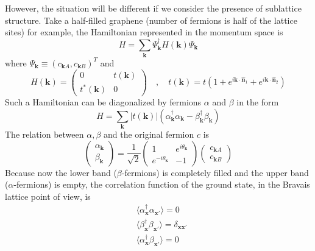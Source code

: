 \documentclass[12font]{article}
\theoremstyle{definition}
\numberwithin{equation}{section}
\newcommand{\anglelr}[1]{\langle #1 \rangle}
\newcommand{\llr}[1]{(  #1  )}
\newcommand{\abs}[1]{\left|  #1  \right|}
\newcommand{\bo}[1]{\mathbf{#1}}
\begin{document}
However, the situation will be different if we consider the presence of sublattice structure. Take a half-filled graphene (number of fermions is half of the lattice sites) for example, the Hamiltonian represented in the momentum space is
\[
H = \sum_{\bo{k}}\Psi_{\bo{k}}^\dagger H\llr{\bo{k}}\Psi_{\bo{k}}
\]
where $\Psi_{\bo{k}}\equiv \llr{c_{\bo{k}A}, c_{\bo{k}B}}^T$ and 
\[
H\llr{\bo{k}} = \begin{pmatrix}
                 0 & t(\bo{k}) \\
                 t^*(\bo{k}) & 0 
               \end{pmatrix} \quad,\quad t(\bo{k}) = t\llr{1 + e^{i\bo{k}\cdot\hat{\bo{n}}_1} + e^{i\bo{k}\cdot\hat{\bo{n}}_2}}
\]
Such a Hamiltonian can be diagonalized by fermions $\alpha$ and $\beta$ in the form
\[
H = \sum_{\bo{k}}\abs{t\llr{\bo{k}}}\llr{\alpha^\dagger_\bo{k}\alpha_\bo{k} - \beta^\dagger_\bo{k}\beta_\bo{k}}
\]
The relation between $\alpha,\beta$ and the original fermion $c$ is
\[
\begin{pmatrix}
  \alpha_\bo{k} \\
  \beta_\bo{k} 
\end{pmatrix} = \frac{1}{\sqrt{2}}\begin{pmatrix}
                                    1 & e^{i\theta_\bo{k}} \\
                                    e^{-i\theta_\bo{k}} & -1 
                                  \end{pmatrix}\begin{pmatrix}
                                                 c_{\bo{k}A} \\
                                                 c_{\bo{k}B} 
                                               \end{pmatrix}
\]
Because now the lower band ($\beta$-fermions) is completely filled and the upper band ($\alpha$-fermions) is empty, the correlation function of the ground state, in the Bravais lattice point of view, is 
\[
\begin{aligned}
& \anglelr{\alpha_\bo{x}^\dagger\alpha_{\bo{x}'}} = 0 \\
& \anglelr{\beta_\bo{x}^\dagger\beta_{\bo{x}'}} = \delta_{\bo{x}\bo{x}'} \\
& \anglelr{\alpha_\bo{x}^\dagger\beta_{\bo{x}'}} = 0
\end{aligned}
\]
\end{document}
